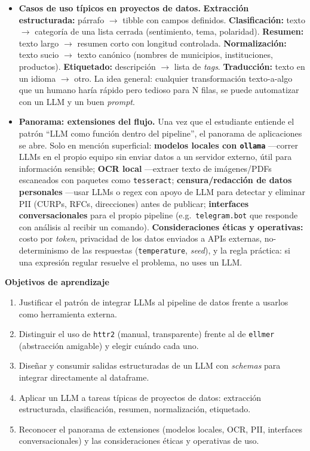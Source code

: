 \documentclass[11pt,letterpaper]{article}
\newcommand{\orange}[1]{{\color{redorange}#1}}
\begin{document}
\begin{itemize}[leftmargin=*, itemsep=2pt]
    \item \textbf{Casos de uso típicos en proyectos de datos.} \textbf{Extracción estructurada:} párrafo $\to$ tibble con campos definidos. \textbf{Clasificación:} texto $\to$ categoría de una lista cerrada (sentimiento, tema, polaridad). \textbf{Resumen:} texto largo $\to$ resumen corto con longitud controlada. \textbf{Normalización:} texto sucio $\to$ texto canónico (nombres de municipios, instituciones, productos). \textbf{Etiquetado:} descripción $\to$ lista de \textit{tags}. \textbf{Traducción:} texto en un idioma $\to$ otro. La idea general: cualquier transformación texto-a-algo que un humano haría rápido pero tedioso para N filas, se puede automatizar con un LLM y un buen \textit{prompt}.
    \item \textbf{Panorama: extensiones del flujo.} Una vez que el estudiante entiende el patrón ``LLM como función dentro del pipeline'', el panorama de aplicaciones se abre. Solo en mención superficial: \textbf{modelos locales con \texttt{ollama}} ---correr LLMs en el propio equipo sin enviar datos a un servidor externo, útil para información sensible; \textbf{OCR local} ---extraer texto de imágenes/PDFs escaneados con paquetes como \texttt{tesseract}; \textbf{censura/redacción de datos personales} ---usar LLMs o regex con apoyo de LLM para detectar y eliminar PII (CURPs, RFCs, direcciones) antes de publicar; \textbf{interfaces conversacionales} para el propio pipeline (e.g.\ \texttt{telegram.bot} que responde con análisis al recibir un comando). \textbf{Consideraciones éticas y operativas:} costo por \textit{token}, privacidad de los datos enviados a APIs externas, no-determinismo de las respuestas (\texttt{temperature}, \textit{seed}), y la regla práctica: \orange{si una expresión regular resuelve el problema, no uses un LLM}.
\end{itemize}

\medskip
\noindent\textbf{Objetivos de aprendizaje}
\begin{enumerate}[leftmargin=*, itemsep=1pt]
    \item Justificar el patrón de integrar LLMs al pipeline de datos frente a usarlos como herramienta externa.
    \item Distinguir el uso de \texttt{httr2} (manual, transparente) frente al de \texttt{ellmer} (abstracción amigable) y elegir cuándo cada uno.
    \item Diseñar y consumir salidas estructuradas de un LLM con \textit{schemas} para integrar directamente al dataframe.
    \item Aplicar un LLM a tareas típicas de proyectos de datos: extracción estructurada, clasificación, resumen, normalización, etiquetado.
    \item Reconocer el panorama de extensiones (modelos locales, OCR, PII, interfaces conversacionales) y las consideraciones éticas y operativas de uso.
\end{enumerate}
\end{document}
